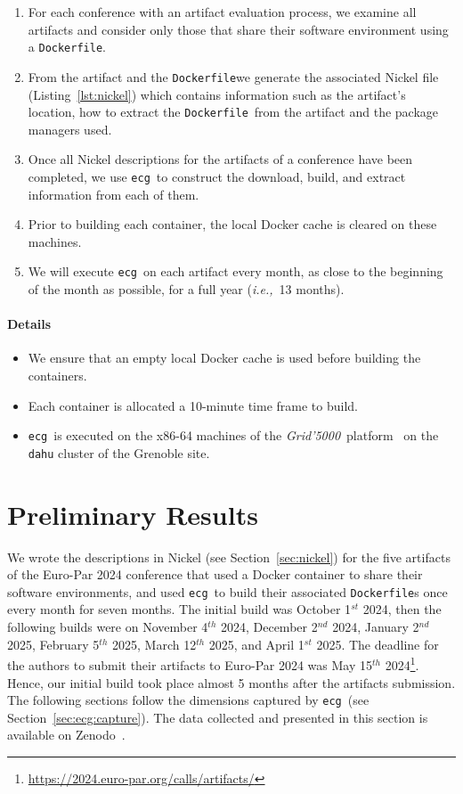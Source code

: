 \documentclass[sigconf,natbib=false]{acmart}
\newcommand{\ie}{\emph{i.e.,}}
\newcommand{\grid}{\emph{Grid'5000}}
\newcommand{\df}{\texttt{Dockerfile}}
\newcommand{\ecg}{\texttt{ecg}}
\begin{document}
\begin{enumerate}
\item For each conference with an artifact evaluation process, we examine all artifacts and consider only those that share their software environment using a \df.
\item From the artifact and the \df we generate the associated Nickel file (Listing~\ref{lst:nickel}) which contains information such as the artifact's location, how to extract the \df\ from the artifact and the package managers used. 
\item Once all Nickel descriptions for the artifacts of a conference have been completed, we use \ecg\ to construct the download, build, and extract information from each of them.
\item Prior to building each container, the local Docker cache is cleared on these machines.
\item We will execute \ecg\ on each artifact every month, as close to the beginning of the month as possible, for a full year (\ie\ 13 months).
\end{enumerate}

\paragraph{Details}
\begin{itemize}
\item We ensure that an empty local Docker cache is used before building the containers.
\item Each container is allocated a 10-minute time frame to build.
\item \ecg\ is executed on the x86-64 machines of the \grid\ platform~\cite{grid5000} on the \texttt{dahu} cluster of the Grenoble site.
\end{itemize}

\section{Preliminary Results}\label{sec:results}

We wrote the descriptions in Nickel (see Section~\ref{sec:nickel}) for the five artifacts of the Euro-Par 2024 conference that used a Docker container to share their software environments, and used \ecg\ to build their associated \df s once every month for seven months.
The initial build was October 1$^{st}$ 2024, then the following builds were on November 4$^{th}$ 2024, December 2$^{nd}$ 2024, January 2$^{nd}$ 2025, February 5$^{th}$ 2025, March 12$^{th}$ 2025, and April 1$^{st}$ 2025.
The deadline for the authors to submit their artifacts to Euro-Par 2024 was May 15$^{th}$ 2024\footnote{\url{https://2024.euro-par.org/calls/artifacts/}}.
Hence, our initial build took place almost 5 months after the artifacts submission.
The following sections follow the dimensions captured by \ecg\ (see Section~\ref{sec:ecg:capture}).
The data collected and presented in this section is available on Zenodo~\cite{dataset_europar24}.
\end{document}
